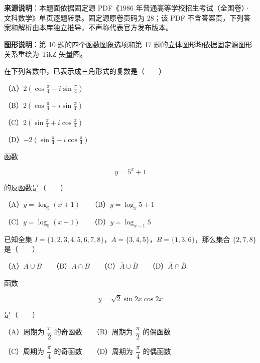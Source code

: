


\begin{gktip}
\textbf{来源说明}：本题面依据固定源 PDF《1986 年普通高等学校招生考试（全国卷）·文科数学》单页逐题转录。固定源原卷页码为 28；该 PDF 不含答案页，下列答案和解析由本库独立推导，不声称代表官方发布版本。

\textbf{图形说明}：第 10 题的四个函数图象选项和第 17 题的立体图形均依据固定源图形关系重绘为 TikZ 矢量图。
\end{gktip}

\begin{question}
在下列各数中，已表示成三角形式的复数是\mbox{（　　）}

（A）$2\left(\cos\frac\pi4-i\sin\frac\pi4\right)$

（B）$2\left(\cos\frac\pi4+i\sin\frac\pi4\right)$

（C）$2\left(\sin\frac\pi4+i\cos\frac\pi4\right)$

（D）$-2\left(\sin\frac\pi4-i\cos\frac\pi4\right)$

\end{question}
\begin{question}
函数

\nopagebreak[4]
\[
y=5^x+1
\]

的反函数是\mbox{（　　）}

（A）$y=\log_5(x+1)$　　（B）$y=\log_x5+1$

（C）$y=\log_5(x-1)$　　（D）$y=\log_{x-1}5$

\end{question}
\begin{question}
已知全集 $I=\{1,2,3,4,5,6,7,8\}$，$A=\{3,4,5\}$，$B=\{1,3,6\}$，那么集合 $\{2,7,8\}$ 是\mbox{（　　）}

（A）$A\cup B$　　（B）$A\cap B$　　（C）$\overline A\cup\overline B$　　（D）$\overline A\cap\overline B$

\end{question}
\begin{question}
函数

\nopagebreak[4]
\[
y=\sqrt2\sin2x\cos2x
\]

是\mbox{（　　）}

（A）周期为 $\dfrac\pi2$ 的奇函数　　（B）周期为 $\dfrac\pi2$ 的偶函数

（C）周期为 $\dfrac\pi4$ 的奇函数　　（D）周期为 $\dfrac\pi4$ 的偶函数

\end{question}
